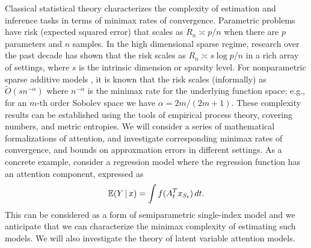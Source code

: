 Classical statistical theory characterizes the complexity of
estimation and inference tasks in terms of minimax rates of
convergence. Parametric problems have risk (expected squared error)
that scales as $R_n \asymp p/n$ when there are $p$ parameters and $n$
samples. In the high dimensional sparse regime, research over the past
decade has shown that the risk scales as $R_n \asymp s \log p/n$ 
in a rich array of settings, where $s$ is the intrinsic dimension or
sparsity level. For nonparametric sparse additive
models \citep{Ravikumar:08}, it is known that the risk
scales (informally) as $\tilde O(s n^{-\alpha})$ where $n^{-\alpha}$ is 
the minimax rate for the underlying function space;
e.g., for an $m$-th order Sobolev space we have
$\alpha = 2m/(2m+1)$. These complexity results can be established using
the tools of empirical process theory, covering numbers, and metric
entropies. We will consider a series of mathematical formalizations
of attention, and investigate corresponding minimax rates of 
convergence, and bounds on approxmation errors in different settings.
As a concrete example, consider a regression model where the regression function 
has an attention component, expressed as 
$$ \mbox{$\mathbb{E}$}(Y\,|\, x) = \int f(A_t^T x_{S_t}) \, dt.$$
This can be considered as a form of semiparametric single-index model
\citep{horowitz09,horowitz96,ichimura93,kakade11,negahban12} 
and we anticipate that we can characterize
the minimax complexity of estimating such models. We will also investigate
the theory of latent variable attention models.





 

